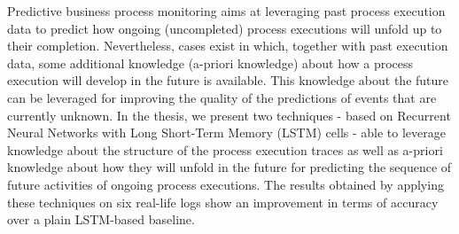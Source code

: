 Predictive business process monitoring aims at leveraging past process execution data to predict how ongoing (uncompleted) process executions will unfold up to
their completion.
Nevertheless, cases exist in which, together with past
execution data, some additional knowledge (a-priori
knowledge) about how a process execution will develop in the future is available. This knowledge about the future can be leveraged for
improving the quality of the predictions of events that are currently unknown. In the thesis, we present two
techniques - based on Recurrent Neural Networks with Long Short-Term Memory (LSTM) cells - able to
leverage knowledge about the structure of the process execution traces as well as a-priori knowledge about how they will unfold in the future for predicting the sequence of future activities of ongoing process executions. The results obtained by applying these techniques on six real-life logs show an improvement in terms of accuracy over a plain
LSTM-based baseline.


